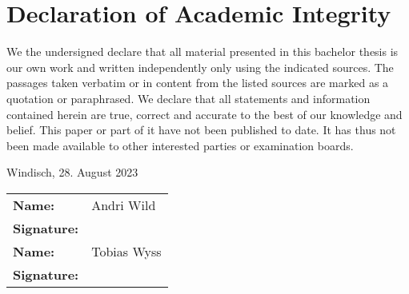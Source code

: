 \chapter{Declaration of Academic Integrity}
We the undersigned declare that all material presented in this bachelor thesis 
is our own work and written independently only using the indicated sources. 
The passages taken verbatim or in content from the listed sources are marked 
as a quotation or paraphrased. We declare that all statements and information contained
herein are true, correct and accurate to the best of our knowledge and
belief. This paper or part of it have not been published to date. It has thus
not been made available to other interested parties or examination boards.

\vspace*{4ex}

Windisch, 28. August 2023

\vspace*{4ex}

\renewcommand{\arraystretch}{2.5}
\begin{tabular}{@{}>{\bfseries}ll}
Name: & Andri Wild\\
Signature: & \\[6ex]
Name: & Tobias Wyss\\
Signature: & \\
\end{tabular}
